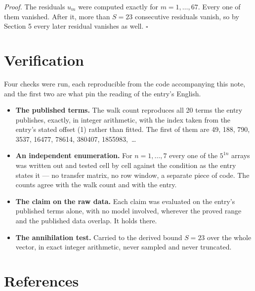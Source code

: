 \documentclass[11pt]{article}
\theoremstyle{definition}
\begin{document}
{\itshape Proof.} The residuals $u_m$ were computed exactly for $m = 1,\dots,67$. Every one of them vanished. After it, more than $S = 23$ consecutive residuals vanish, so by Section 5 every later residual vanishes as well. $\square$

\section{Verification}

Four checks were run, each reproducible from the code accompanying this note, and the first two are what pin the reading of the entry's English.

\begin{itemize}

\item {\bfseries The published terms.} The walk count reproduces all 20 terms the entry publishes, exactly, in integer arithmetic, with the index taken from the entry's stated offset (1) rather than fitted. The first of them are 49, 188, 790, 3537, 16477, 78614, 380407, 1855983,~\dots

\item {\bfseries An independent enumeration.} For $n = 1,\dots,7$ every one of the $5^{1n}$ arrays was written out and tested cell by cell against the condition as the entry states it --- no transfer matrix, no row window, a separate piece of code. The counts agree with the walk count and with the entry.

\item {\bfseries The claim on the raw data.} Each claim was evaluated on the entry's published terms alone, with no model involved, wherever the proved range and the published data overlap. It holds there.

\item {\bfseries The annihilation test.} Carried to the derived bound $S = 23$ over the whole vector, in exact integer arithmetic, never sampled and never truncated.

\end{itemize}

\section{References}
\end{document}
